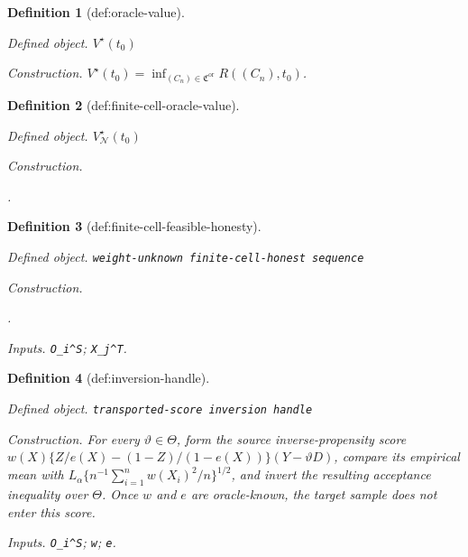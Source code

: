 \documentclass{article}
\newtheorem{definition}{Definition}
\begin{document}
\begin{definition}[def:oracle-value]\label{def:oracle-value}
\par\smallskip\noindent\emph{Defined object.} \(V^\star(t_0)\)
\par\smallskip\noindent\emph{Construction.} \(V^\star(t_0)=\inf_{(C_n)\in\mathfrak C^{\mathrm{or}}}R((C_n),t_0)\).
\end{definition}

\begin{definition}[def:finite-cell-oracle-value]\label{def:finite-cell-oracle-value}
\par\smallskip\noindent\emph{Defined object.} \(V_{\mathcal N}^\star(t_0)\)
\par\smallskip\noindent\emph{Construction.} \par\noindent {}\par\noindent.
\end{definition}

\begin{definition}[def:finite-cell-feasible-honesty]\label{def:finite-cell-feasible-honesty}
\par\smallskip\noindent\emph{Defined object.} \texttt{weight-\allowbreak{}unknown finite-\allowbreak{}cell-\allowbreak{}honest sequence}
\par\smallskip\noindent\emph{Construction.} \par\noindent {}\par\noindent.
\par\smallskip\noindent\emph{Inputs.} \texttt{O\_\allowbreak{}i\textasciicircum{}S}; \texttt{X\_\allowbreak{}j\textasciicircum{}T}.
\end{definition}

\begin{definition}[def:inversion-handle]\label{def:inversion-handle}
\par\smallskip\noindent\emph{Defined object.} \texttt{transported-\allowbreak{}score inversion handle}
\par\smallskip\noindent\emph{Construction.} For every \(\vartheta\in\Theta\), form the source inverse-propensity score \(w(X)\{Z/e(X)-(1-Z)/(1-e(X))\}(Y-\vartheta D)\), compare its empirical mean with \(L_\alpha\{n^{-1}\sum_{i=1}^nw(X_i)^2/n\}^{1/2}\), and invert the resulting acceptance inequality over \(\Theta\).  Once \(w\) and \(e\) are oracle-known, the target sample does not enter this score.
\par\smallskip\noindent\emph{Inputs.} \texttt{O\_\allowbreak{}i\textasciicircum{}S}; \texttt{w}; \texttt{e}.
\end{definition}
\end{document}
